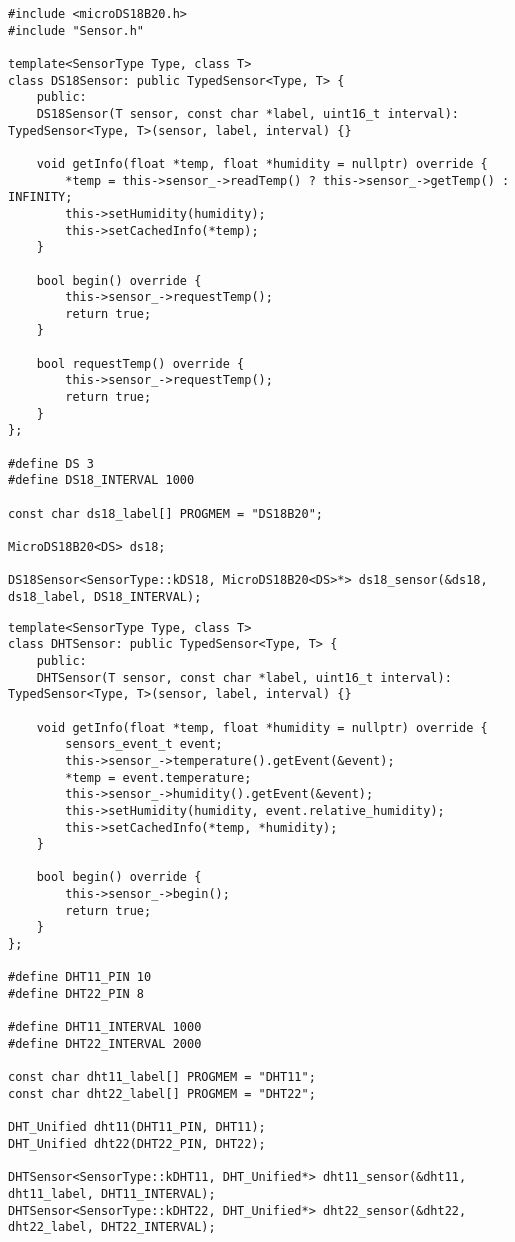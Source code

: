 \begin{lstlisting}[style=cpp-small, caption=Клас-спадок базового класу Sensor для роботи з датчиком DS18B20, label=lst:ds18_sensor]
#include <microDS18B20.h>
#include "Sensor.h"

template<SensorType Type, class T>
class DS18Sensor: public TypedSensor<Type, T> {
    public:
    DS18Sensor(T sensor, const char *label, uint16_t interval): TypedSensor<Type, T>(sensor, label, interval) {}

    void getInfo(float *temp, float *humidity = nullptr) override {
        *temp = this->sensor_->readTemp() ? this->sensor_->getTemp() : INFINITY;
        this->setHumidity(humidity);
        this->setCachedInfo(*temp);
    }

    bool begin() override {
        this->sensor_->requestTemp();
        return true;
    }

    bool requestTemp() override {
        this->sensor_->requestTemp();
        return true;
    }
};

#define DS 3
#define DS18_INTERVAL 1000

const char ds18_label[] PROGMEM = "DS18B20";

MicroDS18B20<DS> ds18;

DS18Sensor<SensorType::kDS18, MicroDS18B20<DS>*> ds18_sensor(&ds18, ds18_label, DS18_INTERVAL);
\end{lstlisting}

\begin{lstlisting}[style=cpp-small, caption=Клас-спадок базового класу Sensor для роботи з датчиком DHT11/DHT22, label=lst:dht_sensor]
template<SensorType Type, class T>
class DHTSensor: public TypedSensor<Type, T> {
    public:
    DHTSensor(T sensor, const char *label, uint16_t interval): TypedSensor<Type, T>(sensor, label, interval) {}

    void getInfo(float *temp, float *humidity = nullptr) override {
        sensors_event_t event;
        this->sensor_->temperature().getEvent(&event);
        *temp = event.temperature;
        this->sensor_->humidity().getEvent(&event);
        this->setHumidity(humidity, event.relative_humidity);
        this->setCachedInfo(*temp, *humidity);
    }

    bool begin() override {
        this->sensor_->begin();
        return true;
    }
};

#define DHT11_PIN 10
#define DHT22_PIN 8

#define DHT11_INTERVAL 1000
#define DHT22_INTERVAL 2000

const char dht11_label[] PROGMEM = "DHT11";
const char dht22_label[] PROGMEM = "DHT22";

DHT_Unified dht11(DHT11_PIN, DHT11);
DHT_Unified dht22(DHT22_PIN, DHT22);

DHTSensor<SensorType::kDHT11, DHT_Unified*> dht11_sensor(&dht11, dht11_label, DHT11_INTERVAL);
DHTSensor<SensorType::kDHT22, DHT_Unified*> dht22_sensor(&dht22, dht22_label, DHT22_INTERVAL);
\end{lstlisting}


